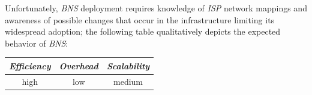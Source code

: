 Unfortunately, \emph{BNS} deployment requires knowledge of 
\emph{ISP} network mappings and awareness of possible changes 
that occur in the infrastructure limiting its widespread adoption;
the following table qualitatively depicts the expected behavior of \emph{BNS}:
\begin{center}
{\footnotesize
\begin{tabular}{ccc}
\emph{Efficiency} & \emph{Overhead} & \emph{Scalability} \\
\hline
high &
low &
medium
\end{tabular}
}
\end{center}

